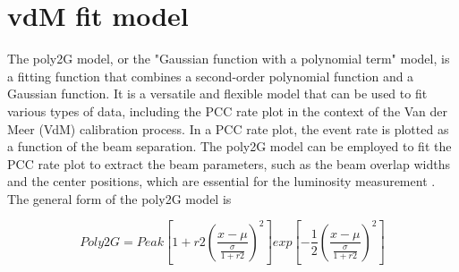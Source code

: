 \section{vdM fit model}

The poly2G model, or the "Gaussian function with a polynomial term" model, is a fitting function that combines a second-order polynomial function and a Gaussian function. It is a versatile and flexible model that can be used to fit various types of data, including the PCC rate plot in the context of the Van der Meer (VdM) calibration process. In a PCC rate plot, the event rate is plotted as a function of the beam separation. The poly2G model can be employed to fit the PCC rate plot to extract the beam parameters, such as the beam overlap widths and the center positions, which are essential for the luminosity measurement \cite{Cekmecelioglu:2775639}. The general form of the poly2G model is



\begin{equation}
Poly2G = Peak  \left [1+r2 \left(\frac{x-\mu} {\frac{\sigma}{1+r2}}\right)^2 \right] exp \left[-\frac{1}{2}\left(\frac{x-\mu}{\frac{\sigma}{1+r2}}\right)^2\right]
\end{equation}

